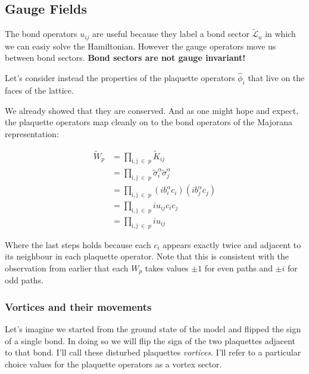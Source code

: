 \hypertarget{gauge-fields}{%
\subsection{Gauge Fields}\label{gauge-fields}}

The bond operators \(u_{ij}\) are useful because they label a bond
sector \(\mathcal{\tilde{L}}_u\) in which we can easiy solve the
Hamiltonian. However the gauge operators move us between bond sectors.
\textbf{Bond sectors are not gauge invariant!}

Let's consider instead the properties of the plaquette operators
\(\hat{\phi}_i\) that live on the faces of the lattice.

We already showed that they are conserved. And as one might hope and
expect, the plaquette operators map cleanly on to the bond operators of
the Majorana representation:

\[\begin{aligned}
\tilde{W}_p &= \prod_{\mathrm{i,j}\; \in\; p} \tilde{K}_{ij}\\
            &= \prod_{\mathrm{i,j}\; \in\; p} \tilde{\sigma}_i^\alpha \tilde{\sigma}_j^\alpha\\
            &= \prod_{\mathrm{i,j}\; \in\; p} (ib^\alpha_i c_i)(ib^\alpha_j c_j)\\
            &= \prod_{\mathrm{i,j}\; \in\; p} i u_{ij} c_i c_j\\
            &= \prod_{\mathrm{i,j}\; \in\; p} i u_{ij}
\end{aligned}\]

Where the last steps holds because each \(c_i\) appears exactly twice
and adjacent to its neighbour in each plaquette operator. Note that this
is consistent with the observation from earlier that each \(W_p\) takes
values \(\pm 1\) for even paths and \(\pm i\) for odd paths.

\hypertarget{vortices-and-their-movements}{%
\subsubsection{Vortices and their
movements}\label{vortices-and-their-movements}}

Let's imagine we started from the ground state of the model and flipped
the sign of a single bond. In doing so we will flip the sign of the two
plaquettes adjacent to that bond. I'll call these disturbed plaquettes
\emph{vortices}. I'll refer to a particular choice values for the
plaquette operators as a vortex sector.

